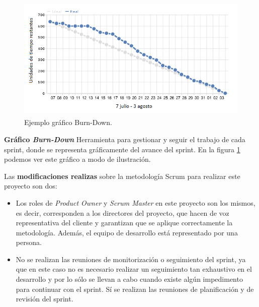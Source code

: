 \begin{figure}[t!]
\centering
\includegraphics[width=12cm,height=6cm]{figuras/burndown.png}
\caption{Ejemplo gráfico Burn-Down.}
\label{fig:burndown}
\end{figure}

\noindent
\textbf{Gráfico \textit{Burn-Down}}
Herramienta para gestionar y seguir el trabajo de cada sprint, donde se representa gráficamente del avance del sprint. En la figura \ref{fig:burndown} podemos ver este gráfico a modo de ilustración.

\noindent
Las \textbf{modificaciones realizas} sobre la metodología Scrum para realizar este proyecto son dos: 
\begin{itemize}
\item Los roles de \textit{Product Owner} y \textit{Scrum Master} en este proyecto son los mismos, es decir, corresponden a los directores del proyecto, que hacen de voz representativa del cliente y garantizan que se aplique correctamente la metodología. Además, el equipo de desarrollo está representado por una persona.
\item No se realizan las reuniones de monitorización o seguimiento del sprint, ya que en este caso no es necesario realizar un seguimiento tan exhaustivo en el desarrollo y por lo sólo se llevan a cabo cuando existe algún impedimento para continuar con el sprint. Sí se realizan las reuniones de planificación y de revisión del sprint.
\end{itemize}

